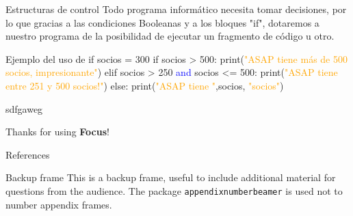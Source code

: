 \documentclass{beamer}
\begin{document}
\begin{frame}{Estructuras de control}
Todo programa informático necesita tomar decisiones, por lo que gracias a las condiciones Booleanas y a los bloques "if", dotaremos a nuestro programa de la posibilidad de ejecutar un fragmento de código u otro.
\begin{Programexample} {Ejemplo del uso de if}
socios = 300 \newline
if socios > 500:\newline
\hspace{3cm}print(\textcolor{orange}{"ASAP tiene más de 500 socios, impresionante"})\newline
elif socios > 250 \textcolor{blue}{and} socios <= 500:\newline
\hspace{2cm}print(\textcolor{orange}{"ASAP tiene entre 251 y 500 socios!"})\newline
else:\newline
\hspace{2cm}print(\textcolor{orange}{"ASAP tiene "},socios, \textcolor{orange}{"socios"})
\end{Programexample}
\end{frame}

\begin{frame}{sdfgaweg}

\end{frame}

\begin{frame}[focus]
Thanks for using \textbf{Focus}!
\end{frame}

\appendix
\begin{frame}{References}
\nocite{*}


\end{frame}

\begin{frame}{Backup frame}
This is a backup frame, useful to include additional material for questions from the audience.
\vfill
The package \texttt{appendixnumberbeamer} is used not to number appendix frames.
\end{frame}
\end{document}
